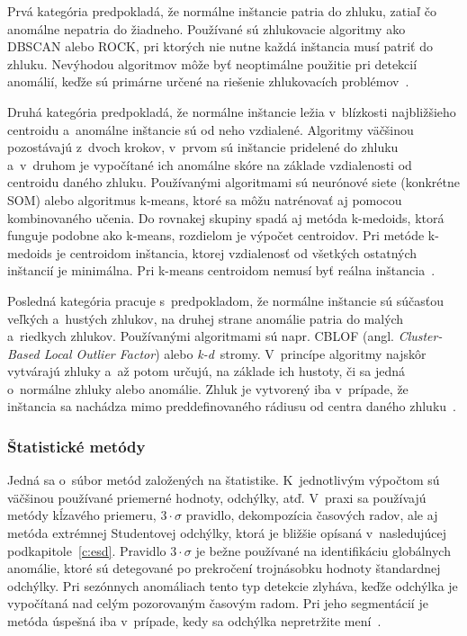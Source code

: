 \documentclass[a4paper,twoside,slovak,12pt,appendix]{article}
\begin{document}
Prvá kategória predpokladá, že normálne inštancie patria do zhluku, zatiaľ čo
anomálne nepatria do žiadneho. Používané sú zhlukovacie algoritmy ako DBSCAN
alebo ROCK, pri ktorých nie nutne každá inštancia musí patriť do zhluku.
Nevýhodou algoritmov môže byť neoptimálne použitie pri detekcií
anomálií, keďže sú primárne určené na riešenie zhlukovacích
problémov~\cite{Chandola2009}.

Druhá kategória predpokladá, že normálne inštancie ležia v~blízkosti
najbližšieho centroidu a~anomálne inštancie sú od neho vzdialené. Algoritmy
väčšinou pozostávajú z~dvoch krokov, v~prvom sú inštancie pridelené do zhluku
a~v~druhom je vypočítané ich anomálne skóre na základe vzdialenosti od centroidu
daného zhluku. Používanými algoritmami sú neurónové siete (konkrétne SOM) alebo
algoritmus k-means, ktoré sa môžu natrénovať aj pomocou kombinovaného učenia. Do
rovnakej skupiny spadá aj metóda k-medoids, ktorá funguje podobne ako k-means,
rozdielom je výpočet centroidov. Pri metóde k-medoids je centroidom inštancia,
ktorej vzdialenosť od všetkých ostatných inštancií je minimálna. Pri k-means
centroidom nemusí byť reálna inštancia~\cite{Chandola2009}.

Posledná kategória pracuje s~predpokladom, že normálne inštancie sú súčasťou
veľkých a~hustých zhlukov, na druhej strane anomálie patria do malých a~riedkych
zhlukov. Používanými algoritmami sú napr. CBLOF
(angl. \textit{Cluster-Based Local Outlier Factor}) alebo \textit{k-d}~stromy.
V~princípe algoritmy najskôr vytvárajú zhluky a~až potom určujú, na základe ich
hustoty, či sa jedná o~normálne zhluky alebo anomálie. Zhluk je vytvorený iba
v~prípade, že inštancia sa nachádza mimo preddefinovaného rádiusu od centra
daného zhluku~\cite{Salvador2005}.

\subsubsection{Štatistické metódy}
Jedná sa o~súbor metód založených na štatistike. K~jednotlivým výpočtom sú
väčšinou používané priemerné hodnoty, odchýlky, atď. V~praxi sa používajú
metódy kĺzavého priemeru, $3\cdot\sigma$ pravidlo, dekompozícia časových radov,
ale aj metóda extrémnej Studentovej odchýlky, ktorá je bližšie opísaná
v~nasledujúcej podkapitole~\ref{c:esd}. Pravidlo $3\cdot\sigma$ je bežne
používané na identifikáciu globálnych anomálie, ktoré sú detegované po
prekročení trojnásobku hodnoty štandardnej odchýlky. Pri sezónnych anomáliach
tento typ detekcie zlyháva, keďže odchýlka je vypočítaná nad celým pozorovaným
časovým radom. Pri jeho segmentácií je metóda úspešná iba v~prípade, kedy sa
odchýlka nepretržite mení~\cite{Hochenbaum2017}.
\end{document}
